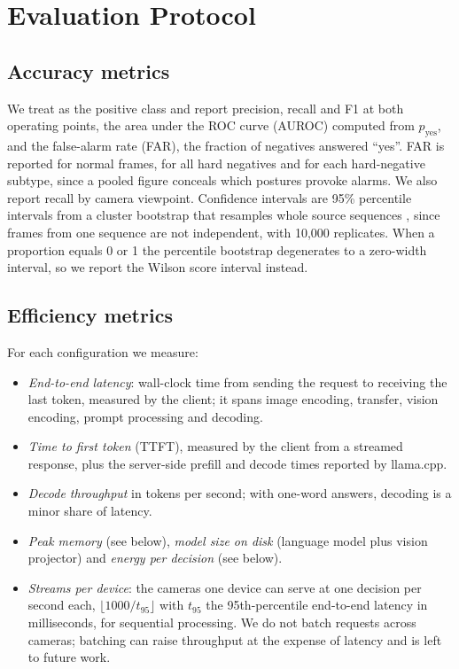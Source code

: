 \section{Evaluation Protocol}
\label{sec:protocol}

\subsection{Accuracy metrics}
We treat \pd{} as the positive class and report precision, recall and F1 at both operating points, the area under the ROC curve (AUROC) computed from $p_\text{yes}$, and the false-alarm rate (FAR), the fraction of negatives answered ``yes''. FAR is reported for normal frames, for all hard negatives and for each hard-negative subtype, since a pooled figure conceals which postures provoke alarms. We also report recall by camera viewpoint. Confidence intervals are 95\% percentile intervals from a cluster bootstrap that resamples whole source sequences \cite{efron1993bootstrap}, since frames from one sequence are not independent, with 10,000 replicates. When a proportion equals 0 or 1 the percentile bootstrap degenerates to a zero-width interval, so we report the Wilson score interval instead.

\subsection{Efficiency metrics}
For each configuration we measure:
\begin{itemize}
  \item \textit{End-to-end latency}: wall-clock time from sending the request to receiving the last token, measured by the client; it spans image encoding, transfer, vision encoding, prompt processing and decoding.
  \item \textit{Time to first token} (TTFT), measured by the client from a streamed response, plus the server-side prefill and decode times reported by llama.cpp.
  \item \textit{Decode throughput} in tokens per second; with one-word answers, decoding is a minor share of latency.
  \item \textit{Peak memory} (see below), \textit{model size on disk} (language model plus vision projector) and \textit{energy per decision} (see below).
  \item \textit{Streams per device}: the cameras one device can serve at one decision per second each, $\lfloor 1000 / t_{95} \rfloor$ with $t_{95}$ the 95th-percentile end-to-end latency in milliseconds, for sequential processing. We do not batch requests across cameras; batching can raise throughput at the expense of latency and is left to future work.
\end{itemize}

